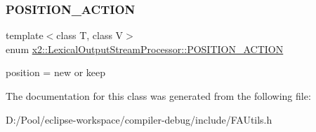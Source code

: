 \subsubsection{\texorpdfstring{P\+O\+S\+I\+T\+I\+O\+N\+\_\+\+A\+C\+T\+I\+ON}{POSITION\_ACTION}}
{\footnotesize\ttfamily template$<$class T, class V$>$ \\
enum \hyperlink{classx2_1_1_lexical_output_stream_processor_a221c7064aea399ed949761e3e784acd7}{x2\+::\+Lexical\+Output\+Stream\+Processor\+::\+P\+O\+S\+I\+T\+I\+O\+N\+\_\+\+A\+C\+T\+I\+ON}}

position = new or keep 

The documentation for this class was generated from the following file\+:\begin{DoxyCompactItemize}
\item 
D\+:/\+Pool/eclipse-\/workspace/compiler-\/debug/include/F\+A\+Utils.\+h\end{DoxyCompactItemize}
